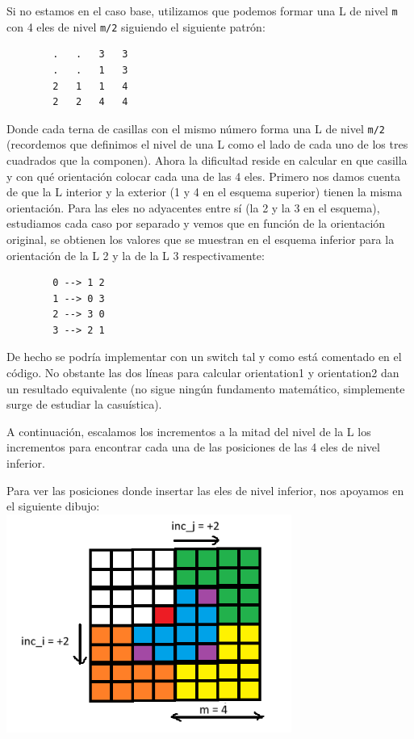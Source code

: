 \documentclass{article}
\begin{document}
    Si no estamos en el caso base, utilizamos que podemos formar una L
    de nivel \texttt{m} con 4 eles de nivel \texttt{m/2} siguiendo el
    siguiente patrón: \\
    \begin{verbatim}
        .   .   3   3
        .   .   1   3
        2   1   1   4  
        2   2   4   4
    \end{verbatim}
    Donde cada terna de casillas con el mismo número forma una L de nivel
    \texttt{m/2} (recordemos que definimos el nivel de una L como el lado
    de cada uno de los tres cuadrados que la componen).
    Ahora la dificultad reside en calcular en que casilla y con qué
    orientación colocar cada una de las 4 eles.
    Primero nos damos cuenta de que la L interior y la exterior (1 y 4 en
    el esquema superior) tienen la misma orientación. Para las eles no
    adyacentes entre sí (la 2 y la 3 en el esquema), estudiamos cada caso
    por separado y vemos que en función de la orientación original, se
    obtienen los valores que se muestran en el esquema inferior para la
    orientación de la L 2 y la de la L 3 respectivamente: \\
    \begin{verbatim}
        0 --> 1 2
        1 --> 0 3
        2 --> 3 0
        3 --> 2 1
    \end{verbatim}
    De hecho se podría implementar con un switch tal y como está comentado
    en el código. No obstante las dos líneas para calcular orientation1
    y orientation2 dan un resultado equivalente (no sigue ningún fundamento
    matemático, simplemente surge de estudiar la casuística). 
    
    A continuación, escalamos los incrementos a la mitad del nivel de la L
    los incrementos para encontrar cada una de las posiciones de las 4 eles
    de nivel inferior.

    Para ver las posiciones donde insertar las eles de nivel inferior,
    nos apoyamos en el siguiente dibujo: \\

    \includegraphics[width=0.7\textwidth]{P2/explicación1.png}
\end{document}
